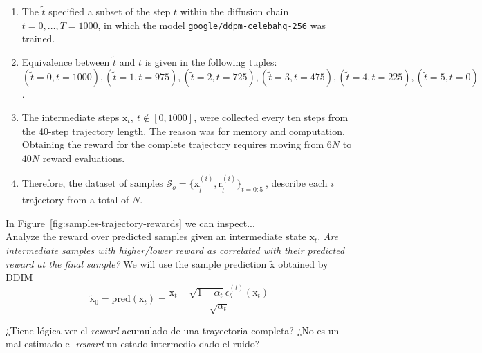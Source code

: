 \begin{enumerate}
\item The $\tilde{t}$ specified a subset of the step $t$ within the diffusion chain $t=0, \dots, T=1000$, in which the model \texttt{google/ddpm-celebahq-256} was trained.
\item Equivalence between $\tilde{t}$ and $t$ is given in the following tuples:
$(\tilde{t}=0, t=1000), (\tilde{t}=1, t=975), (\tilde{t}=2, t=725), (\tilde{t}=3, t=475), (\tilde{t}=4, t=225), (\tilde{t}=5, t=0)$.
\item The intermediate steps $\mathrm{x}_{t}, ~t\notin [0,1000]$, were collected every ten steps from the 40-step trajectory length. The reason was for memory and computation. Obtaining the reward for the complete trajectory requires moving from $6N$ to $40N$ reward evaluations.
\item Therefore, the dataset of samples $\mathcal{S}_{o} =  \big\{\mathrm{x}_{\tilde{t}}^{(i)}, \mathrm{r}_{\tilde{t}}^{(i)} \big\}_{\tilde{t}=0:5}~$, describe each $i$ trajectory from a total of $N$.
\end{enumerate}

In Figure~\ref{fig:samples-trajectory-rewards} we can inspect...\\

Analyze the reward over predicted samples given an intermediate
state $\mathrm{x}_{t}$. \textit{Are intermediate samples with higher/lower reward as correlated with their predicted reward at the final sample?} We
will use the sample prediction $\tilde{\mathrm{x}}$ obtained by DDIM
\begin{equation}\label{ddim-predicted-sample}
  \tilde{\mathrm{x}}_{0}=\text{pred}(\mathrm{x}_{t})=\frac{\mathrm{x}_{t}-\sqrt{1-\alpha_{t}}\epsilon_{\theta}^{(t)}(\mathrm{x}_{t})}{\sqrt{\alpha_{t}}}
\end{equation}

¿Tiene lógica ver el \textit{reward} acumulado de una trayectoria completa?
¿No es un mal estimado el \textit{reward} un estado intermedio dado el ruido?

